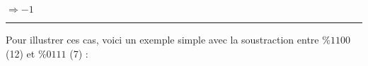 \documentclass[11pt,a4paper]{article}
\begin{document}
\begin{center}
\begin{table}[ht!]
\begin{minipage}{0.15\textwidth}
  \end{minipage}
  \hfillx
  \begin{minipage}{0.1\textwidth}

\textcolor{gray(x11gray)}{$ \mathit{\Rightarrow -1} $}

  \end{minipage}
\end{table}

\rule{1.0\linewidth}{0.75pt}
\end{center}

\vfillFirst


\medskip

Pour illustrer ces cas, voici un exemple simple avec la soustraction entre $ \% 1100 $ (12) et $ \% 0111 $ (7) :
\end{document}
